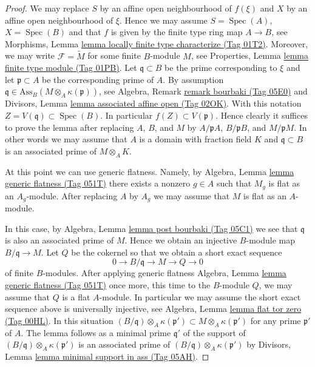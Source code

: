 \documentclass{amsart}
\theoremstyle{plain}
\theoremstyle{definition}
\theoremstyle{remark}
\numberwithin{equation}{subsection}
\def\Spec{\mathop{\mathrm{Spec}}}
\begin{document}
\begin{proof}
We may replace $S$ by an affine open neighbourhood of $f(\xi)$
and $X$ by an affine open neighbourhood of $\xi$. Hence we may assume
$S = \Spec(A)$, $X = \Spec(B)$ and that $f$ is given by
the finite type ring map $A \to B$, see
Morphisms, Lemma \href{https://stacks.math.columbia.edu/tag/01T2}{lemma locally finite type characterize (Tag 01T2)}.
Moreover, we may write $\mathcal{F} = \widetilde{M}$ for some finite
$B$-module $M$, see
Properties, Lemma \href{https://stacks.math.columbia.edu/tag/01PB}{lemma finite type module (Tag 01PB)}.
Let $\mathfrak q \subset B$ be the prime corresponding to $\xi$ and
let $\mathfrak p \subset A$ be the corresponding prime of $A$.
By assumption $\mathfrak q \in \text{Ass}_B(M \otimes_A \kappa(\mathfrak p))$,
see
Algebra, Remark \href{https://stacks.math.columbia.edu/tag/05E0}{remark bourbaki (Tag 05E0)}
and
Divisors, Lemma \href{https://stacks.math.columbia.edu/tag/02OK}{lemma associated affine open (Tag 02OK)}.
With this notation $Z = V(\mathfrak q) \subset \Spec(B)$.
In particular $f(Z) \subset V(\mathfrak p)$. Hence clearly it suffices to
prove the lemma after replacing $A$, $B$, and $M$ by
$A/\mathfrak pA$, $B/\mathfrak pB$, and $M/\mathfrak pM$.
In other words we may assume that $A$ is a domain with fraction field
$K$ and $\mathfrak q \subset B$ is an associated prime of $M \otimes_A K$.

\medskip\noindent
At this point we can use generic flatness. Namely, by
Algebra, Lemma \href{https://stacks.math.columbia.edu/tag/051T}{lemma generic flatness (Tag 051T)}
there exists a nonzero $g \in A$ such that $M_g$ is flat
as an $A_g$-module. After replacing $A$ by $A_g$ we may assume that
$M$ is flat as an $A$-module.

\medskip\noindent
In this case, by
Algebra, Lemma \href{https://stacks.math.columbia.edu/tag/05C1}{lemma post bourbaki (Tag 05C1)}
we see that $\mathfrak q$ is also an associated prime of $M$.
Hence we obtain an injective $B$-module map $B/\mathfrak q \to M$.
Let $Q$ be the cokernel so that we obtain a short exact sequence
$$
0 \to B/\mathfrak q \to M \to Q \to 0
$$
of finite $B$-modules. After applying generic flatness
Algebra, Lemma \href{https://stacks.math.columbia.edu/tag/051T}{lemma generic flatness (Tag 051T)}
once more, this time to the $B$-module $Q$, we may assume that $Q$
is a flat $A$-module. In particular we may assume the short exact
sequence above is universally injective, see
Algebra, Lemma \href{https://stacks.math.columbia.edu/tag/00HL}{lemma flat tor zero (Tag 00HL)}.
In this situation
$(B/\mathfrak q) \otimes_A \kappa(\mathfrak p')
\subset M \otimes_A \kappa(\mathfrak p')$
for any prime $\mathfrak p'$ of $A$. The lemma follows as a minimal
prime $\mathfrak q'$ of the support of
$(B/\mathfrak q) \otimes_A \kappa(\mathfrak p')$
is an associated prime of $(B/\mathfrak q) \otimes_A \kappa(\mathfrak p')$ by
Divisors, Lemma \href{https://stacks.math.columbia.edu/tag/05AH}{lemma minimal support in ass (Tag 05AH)}.
\end{proof}
\end{document}
